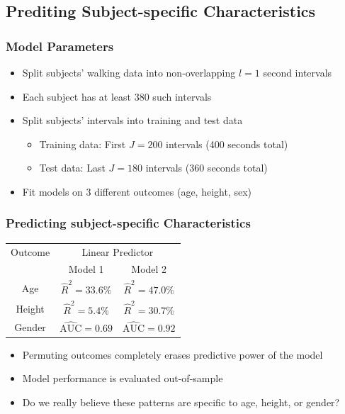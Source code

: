 \documentclass[10pt]{beamer}\usepackage[]{graphicx}\usepackage[]{color}
\begin{document}
\subsection{Prediting Subject-specific Characteristics}
\begin{frame}
\frametitle{Model Parameters}
\begin{itemize}
\item Split subjects' walking data into non-overlapping $l=1$ second intervals
\item Each subject has at least $380$ such intervals
\item Split subjects' intervals into training and test data
    \begin{itemize}
    \item Training data: First $J=200$ intervals (400 seconds total)
    \item Test data: Last $J=180$ intervals (360 seconds total)
    \end{itemize}
\item Fit models on 3 different outcomes (age, height, sex)
\end{itemize}
\end{frame}


\begin{frame}
\frametitle{Predicting subject-specific Characteristics}
\centering
\begin{tabular}{ccc}\toprule
Outcome     &  \multicolumn{2}{c}{Linear Predictor}  \\ \cmidrule(lr){1-1}\cmidrule(lr){2-3}
            &      Model 1  &  Model 2 \\ \cmidrule(lr){3-3}\cmidrule(lr){2-2} 
Age         &  $\hat{R}^2 = 33.6\%$ &  $\hat{R}^2 = 47.0\%$ \\
Height      &  $\hat{R}^2 = 5.4\%$ &  $\hat{R}^2 = 30.7\%$ \\
Gender      &  $\hat{\text{AUC}} = 0.69$ & $\hat{\text{AUC}} = 0.92$ \\ \bottomrule
\end{tabular}

\begin{itemize}
\item Permuting outcomes completely erases predictive power of the model
\item Model performance is evaluated out-of-sample
\item Do we really believe these patterns are specific to age, height, or gender?
\end{itemize}
\end{frame}
\end{document}

